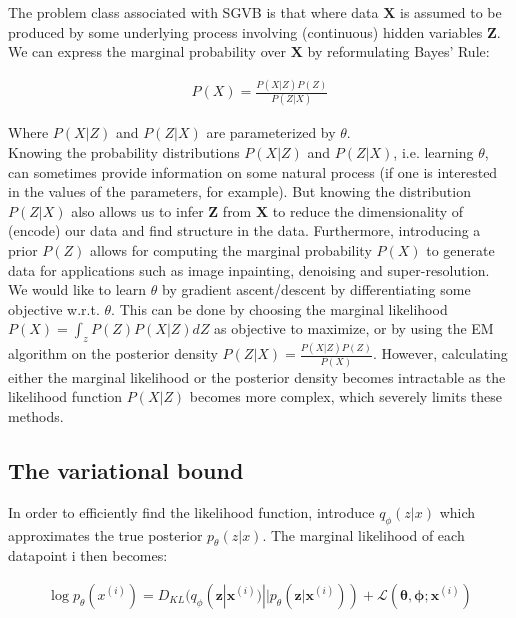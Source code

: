 \documentclass{article}
\begin{document}
The problem class associated with SGVB is that where data $\mathbf{X}$ is assumed to be produced by some underlying process involving (continuous) hidden variables $\mathbf{Z}$. We can express the marginal probability over $\mathbf{X}$ by reformulating Bayes' Rule:

\begin{align}
P(X) = \frac{P(X|Z)P(Z)}{P(Z|X)}
\end{align}

Where $P(X|Z)$ and $P(Z|X)$ are parameterized by $\theta$.
\\

Knowing the probability distributions $P(X|Z)$ and $P(Z|X)$, i.e. learning $\theta$, can sometimes provide information on some natural process (if one is interested in the values of the parameters, for example). But knowing the distribution $P(Z|X)$ also allows us to infer $\mathbf{Z}$ from $\mathbf{X}$ to reduce the dimensionality of (encode) our data and find structure in the data. Furthermore, introducing a prior $P(Z)$ allows for computing the marginal probability $P(X)$ to generate data for applications such as image inpainting, denoising and super-resolution.
We would like to learn $\theta$ by gradient ascent/descent by differentiating some objective w.r.t. $\theta$. This can be done by choosing the marginal likelihood $P(X) = \int_z P(Z) P(X|Z) dZ$ as objective to maximize, or by using the EM algorithm on the posterior density $ P(Z|X) = \frac{P(X|Z)P(Z)}{P(X)}$. However, calculating either  the marginal likelihood or the posterior density becomes intractable as the likelihood function $P(X|Z)$ becomes more complex, which severely limits these methods.

\subsection{The variational bound}

In order to efficiently find the likelihood function, \cite{kingma2013auto} introduce $q_\phi(z|x)$ which approximates the true posterior $p_\theta(z|x)$. The marginal likelihood of each datapoint i then becomes:

\begin{align}
	\log p_\theta(x^{(i)}) = D_{KL}(q_\phi(\mathbf{z}|\mathbf{x}^{(i)}) || p_\theta(\mathbf{z}|\mathbf{x}^{(i)})) + \mathcal{L}(\mathbf{\theta}, \mathbf{\phi}; \mathbf{x}^{(i)})
\end{align} 
\end{document}
